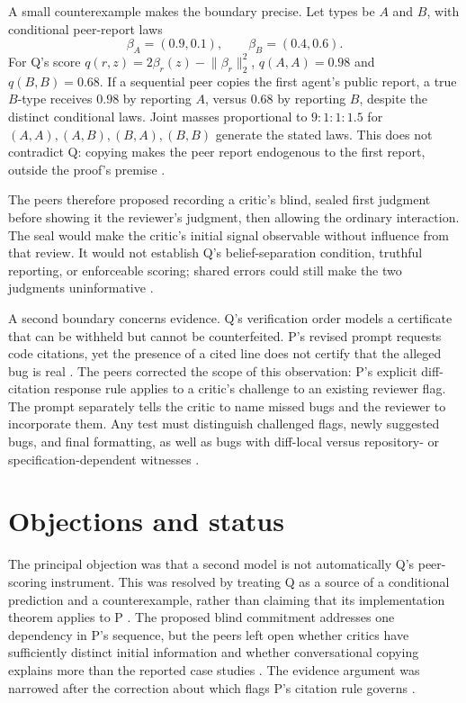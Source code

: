 \documentclass{article}
\begin{document}
A small counterexample makes the boundary precise. Let types be \(A\) and \(B\), with conditional peer-report laws
\[
\beta_A=(0.9,0.1),\qquad \beta_B=(0.4,0.6).
\]
For Q's score \(q(r,z)=2\beta_r(z)-\lVert\beta_r\rVert_2^2\), \(q(A,A)=0.98\) and \(q(B,B)=0.68\). If a sequential peer copies the first agent's public report, a true \(B\)-type receives \(0.98\) by reporting \(A\), versus \(0.68\) by reporting \(B\), despite the distinct conditional laws. Joint masses proportional to \(9:1:1:1.5\) for \((A,A),(A,B),(B,A),(B,B)\) generate the stated laws. This does not contradict Q: copying makes the peer report endogenous to the first report, outside the proof's premise .

The peers therefore proposed recording a critic's blind, sealed first judgment before showing it the reviewer's judgment, then allowing the ordinary interaction. The seal would make the critic's initial signal observable without influence from that review. It would not establish Q's belief-separation condition, truthful reporting, or enforceable scoring; shared errors could still make the two judgments uninformative .

A second boundary concerns evidence. Q's verification order models a certificate that can be withheld but cannot be counterfeited. P's revised prompt requests code citations, yet the presence of a cited line does not certify that the alleged bug is real . The peers corrected the scope of this observation: P's explicit diff-citation response rule applies to a critic's challenge to an existing reviewer flag. The prompt separately tells the critic to name missed bugs and the reviewer to incorporate them. Any test must distinguish challenged flags, newly suggested bugs, and final formatting, as well as bugs with diff-local versus repository- or specification-dependent witnesses .

\section*{Objections and status}

The principal objection was that a second model is not automatically Q's peer-scoring instrument. This was resolved by treating Q as a source of a conditional prediction and a counterexample, rather than claiming that its implementation theorem applies to P . The proposed blind commitment addresses one dependency in P's sequence, but the peers left open whether critics have sufficiently distinct initial information and whether conversational copying explains more than the reported case studies . The evidence argument was narrowed after the correction about which flags P's citation rule governs .
\end{document}
